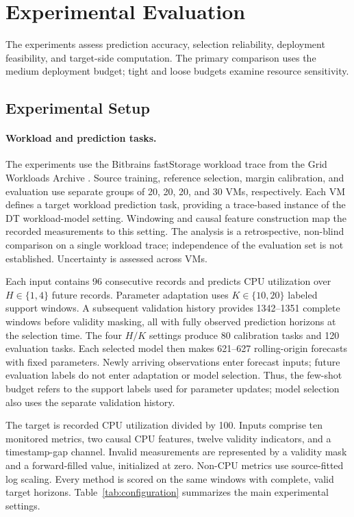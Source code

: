 \documentclass[a4paper,fleqn]{cas-sc}
\begin{document}
\section{Experimental Evaluation}
\label{sec:experiments}
The experiments assess prediction accuracy, selection reliability, deployment
feasibility, and target-side computation. The primary comparison uses the
medium deployment budget; tight and loose budgets examine resource sensitivity.

\subsection{Experimental Setup}
\label{subsec:experimental-setup}
\paragraph{Workload and prediction tasks.}
The experiments use the Bitbrains fastStorage workload trace from the Grid
Workloads Archive \cite{refBitbrains,refGWA}. Source training, reference
selection, margin calibration, and evaluation use separate groups of 20, 20,
20, and 30 VMs, respectively. Each VM defines a target workload prediction
task, providing a trace-based instance of the DT workload-model setting.
Windowing and causal feature construction map the recorded measurements to
this setting. The analysis is a retrospective, non-blind comparison on a single
workload trace; independence of the evaluation set is not established.
Uncertainty is assessed across VMs.

Each input contains 96 consecutive records and predicts CPU utilization over
$H\in\{1,4\}$ future records. Parameter adaptation uses $K\in\{10,20\}$
labeled support windows. A subsequent validation history provides
1342--1351 complete windows before validity masking, all with fully observed
prediction horizons at the selection time. The four $H/K$ settings produce
80 calibration tasks and 120 evaluation tasks. Each selected model then makes
621--627 rolling-origin forecasts with fixed parameters. Newly arriving
observations enter forecast inputs; future evaluation labels do not enter
adaptation or model selection. Thus, the few-shot budget refers to the
support labels used for parameter updates; model selection also uses the
separate validation history.

The target is recorded CPU utilization divided by 100. Inputs comprise ten
monitored metrics, two causal CPU features, twelve validity indicators, and
a timestamp-gap channel. Invalid measurements are represented by a validity
mask and a forward-filled value, initialized at zero. Non-CPU metrics use
source-fitted log scaling. Every method is scored on the same windows with
complete, valid target horizons. Table~\ref{tab:configuration} summarizes the main experimental settings.
\end{document}
